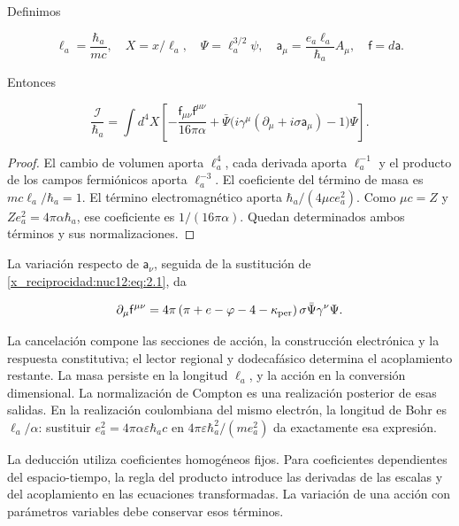Definimos



\[
\ell_a=\frac{\hbar_a}{mc},\quad X=x/\ell_a,\quad
\Psi=\ell_a^{3/2}\psi,\quad
\mathsf a_\mu=\frac{e_a\ell_a}{\hbar_a}A_\mu,\quad
\mathsf f=d\mathsf a.
\]



Entonces



\begin{equation}
\boxed{\frac{\mathcal I}{\hbar_a}=
\int d^4X\left[
-\frac{\mathsf f_{\mu\nu}\mathsf f^{\mu\nu}}{16\pi\alpha}
+\bar\Psi\bigl(i\gamma^\mu(\partial_\mu+i\sigma\mathsf a_\mu)-1\bigr)\Psi
\right].}
\label{x_reciprocidad:nuc12:eq:3.3}
\end{equation}



\begin{proof}
El cambio de volumen aporta \(\ell_a^4\), cada derivada aporta \(\ell_a^{-1}\) y el producto de los campos fermiónicos aporta \(\ell_a^{-3}\). El coeficiente del término de masa es \(mc\ell_a/\hbar_a=1\). El término electromagnético aporta \(\hbar_a/(4\mu c e_a^2)\). Como \(\mu c=Z\) y \(Ze_a^2=4\pi\alpha\hbar_a\), ese coeficiente es \(1/(16\pi\alpha)\). Quedan determinados ambos términos y sus normalizaciones.
\end{proof}

La variación respecto de \(\mathsf a_\nu\), seguida de la sustitución de \eqref{x_reciprocidad:nuc12:eq:2.1}, da



\begin{equation}
\partial_\mu\mathsf f^{\mu\nu}
=4\pi\left(\pi+e-\varphi-4-\kappa_{\rm per}\right)
\sigma\bar\Psi\gamma^\nu\Psi .
\label{x_reciprocidad:nuc12:eq:3.4}
\end{equation}



La cancelación compone las secciones de acción, la construcción electrónica y la respuesta constitutiva; el lector regional y dodecafásico determina el acoplamiento restante. La masa persiste en la longitud \(\ell_a\), y la acción en la conversión dimensional. La normalización de Compton es una realización posterior de esas salidas. En la realización coulombiana del mismo electrón, la longitud de Bohr es \(\ell_a/\alpha\): sustituir \(e_a^2=4\pi\alpha\varepsilon\hbar_a c\) en \(4\pi\varepsilon\hbar_a^2/(m e_a^2)\) da exactamente esa expresión.

La deducción utiliza coeficientes homogéneos fijos. Para coeficientes dependientes del espacio-tiempo, la regla del producto introduce las derivadas de las escalas y del acoplamiento en las ecuaciones transformadas. La variación de una acción con parámetros variables debe conservar esos términos.

